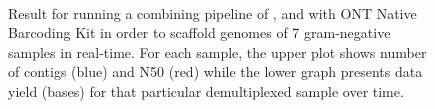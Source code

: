 \begin{figure}[!hpb]
{}%
{}%
\\
%
\caption[A combining pipeline of \npreader{}, \npbarcode{} and \npscarf{} with ONT Native Barcoding Kit]{Result for running a combining pipeline of \npreader{}, \npbarcode{} and \npscarf{} with ONT Native Barcoding Kit in order to scaffold genomes of 7 gram-negative samples in real-time. For each sample, the upper plot shows number of contigs (blue) and N50 (red) while the lower graph presents data yield (bases) for that particular demultiplexed sample over time.}
\label{fig:scaffold}
\end{figure}

